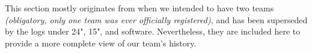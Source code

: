 This section mostly originates from when we intended to have two teams
\textit{(obligatory, only one team was ever officially registered)}, and has
been superseded by the logs under 24", 15", and software. Nevertheless, they are
included here to provide a more complete view of our team's history.




